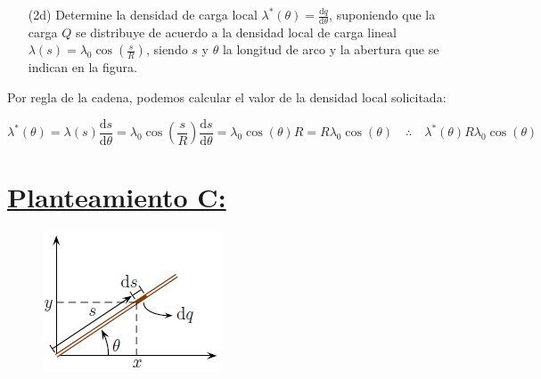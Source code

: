 \documentclass[a4paper,10pt]{article}
\begin{document}
\begin{itemize}
    \item[(2d)] Determine la densidad de carga local
    $\lambda^*(\theta)=\frac{\mathrm{d}q}{\mathrm{d}\theta}$, suponiendo que la carga $Q$
    se distribuye de acuerdo a la densidad local de carga lineal
    $\lambda(s)=\lambda_{0}\cos\left(\frac{s}{R}\right)$,
    siendo $s$ y $\theta$ la longitud de arco y la abertura que se indican en la figura.
\end{itemize}

Por regla de la cadena, podemos calcular el valor de la densidad local solicitada:

\begin{equation*}
    \lambda^*(\theta)=\lambda(s)\frac{\mathrm{d}s}{\mathrm{d}\theta}
    =\lambda_{0}\cos\left(\frac{s}{R}\right)\frac{\mathrm{d}s}{\mathrm{d}\theta}
    =\lambda_{0}\cos\left(\theta\right)R
    =R\lambda_{0}\cos\left(\theta\right)
    \quad\therefore\quad
    \boxed{\lambda^*(\theta)R\lambda_{0}\cos\left(\theta\right)}
\end{equation*}

\newpage

\section*{\underline{Planteamiento C:}}

\begin{figure}
    \vspace{-10pt}
    \centering\includegraphics[width=\linewidth]{Graphics/PlanteamientoC.png}
    \vspace{-20pt}
\end{figure}
\end{document}
